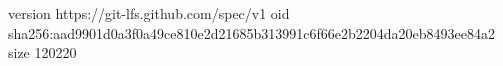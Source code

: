 version https://git-lfs.github.com/spec/v1
oid sha256:aad9901d0a3f0a49ce810e2d21685b313991c6f66e2b2204da20eb8493ee84a2
size 120220

